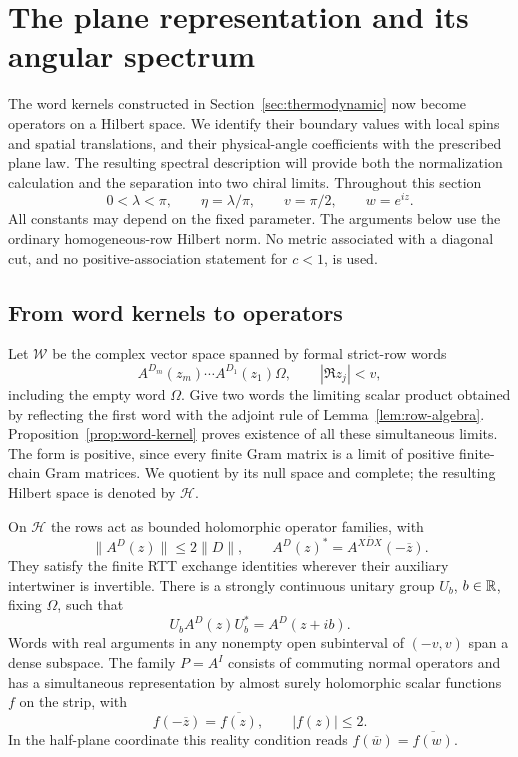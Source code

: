 \section{The plane representation and its angular spectrum}\label{sec:angular}

The word kernels constructed in Section~\ref{sec:thermodynamic} now become
operators on a Hilbert space.  We identify their boundary values with local
spins and spatial translations, and their physical-angle coefficients with
the prescribed plane law.  The resulting spectral description will provide
both the normalization calculation and the separation into two chiral
limits.  Throughout this section
\[
 0<\lambda<\pi,\qquad \eta=\lambda/\pi,\qquad v=\pi/2,
 \qquad w=e^{iz}.
\]
All constants may depend on the fixed parameter.  The arguments below use
the ordinary homogeneous-row Hilbert norm.  No metric associated with a
diagonal cut, and no positive-association statement for $c<1$, is used.

\subsection{From word kernels to operators}

Let $\mathcal W$ be the complex vector space spanned by formal strict-row
words
\[
 A^{D_m}(z_m)\cdots A^{D_1}(z_1)\Omega,
 \qquad |\Re z_j|<v,
\]
including the empty word $\Omega$.  Give two words the limiting scalar
product obtained by reflecting the first word with the adjoint rule of
Lemma~\ref{lem:row-algebra}.  Proposition~\ref{prop:word-kernel} proves
existence of all these simultaneous limits.  The form is positive, since
every finite Gram matrix is a limit of positive finite-chain Gram matrices.
We quotient by its null space and complete; the resulting Hilbert space is
denoted by $\mathcal H$.

\begin{proposition}\label{prop:angular-space}
On $\mathcal H$ the rows act as bounded holomorphic operator families, with
\[
 \|A^D(z)\|\le 2\|D\|,\qquad
 A^D(z)^*=A^{X\overline D X}(-\overline z).
\]
They satisfy the finite RTT exchange identities wherever their auxiliary
intertwiner is invertible.  There is a strongly continuous unitary group
$U_b$, $b\in\mathbb R$, fixing $\Omega$, such that
\begin{equation}\label{eq:angular-covariance}
 U_bA^D(z)U_b^*=A^D(z+ib).
\end{equation}
Words with real arguments in any nonempty open subinterval of $(-v,v)$
span a dense subspace.  The family $P=A^I$ consists of commuting normal
operators and has a simultaneous representation by almost surely
holomorphic scalar functions $f$ on the strip, with
\begin{equation}\label{eq:angular-scalar-star}
 f(-\overline z)=\overline{f(z)},\qquad |f(z)|\le2.
\end{equation}
In the half-plane coordinate this reality condition reads
$f(\overline w)=\overline{f(w)}$.
\end{proposition}

